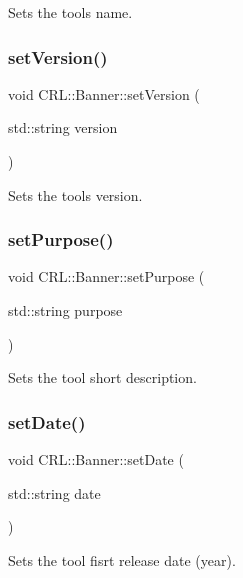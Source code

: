 Sets the tool\textquotesingle{}s name. \mbox{\label{classCRL_1_1Banner_ab47057fcc6d9fb9bca0ebbeae232f738}} 
\subsubsection{\texorpdfstring{set\+Version()}{setVersion()}}
{\footnotesize\ttfamily void C\+R\+L\+::\+Banner\+::set\+Version (\begin{DoxyParamCaption}\item[{std\+::string}]{version }\end{DoxyParamCaption})}

Sets the tool\textquotesingle{}s version. \mbox{\label{classCRL_1_1Banner_a9c6bee971231044f417aaac312abcb61}} 
\subsubsection{\texorpdfstring{set\+Purpose()}{setPurpose()}}
{\footnotesize\ttfamily void C\+R\+L\+::\+Banner\+::set\+Purpose (\begin{DoxyParamCaption}\item[{std\+::string}]{purpose }\end{DoxyParamCaption})}

Sets the tool short description. \mbox{\label{classCRL_1_1Banner_a4ae67d1e584a384e7320af6fadf5dcaa}} 
\subsubsection{\texorpdfstring{set\+Date()}{setDate()}}
{\footnotesize\ttfamily void C\+R\+L\+::\+Banner\+::set\+Date (\begin{DoxyParamCaption}\item[{std\+::string}]{date }\end{DoxyParamCaption})}

Sets the tool fisrt release date (year). \mbox{\label{classCRL_1_1Banner_a191a83c7b8e7e1ab907418d56656d836}} 
